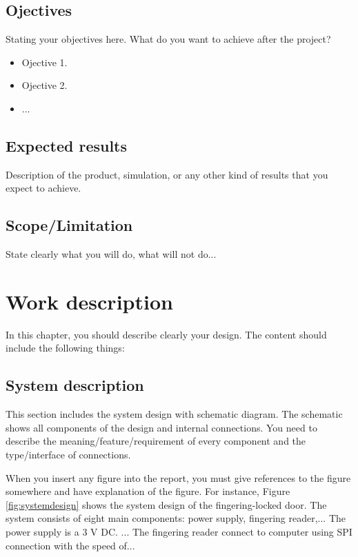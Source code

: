\documentclass[12pt]{report}
\begin{document}
\section{Ojectives}

Stating your objectives here. What do you want to achieve after the project?
\begin{itemize}
	\item Ojective 1.
	\item Ojective 2.
	\item ...
\end{itemize}

\section{Expected results}
Description of the product, simulation, or any other kind of results
that you expect to achieve.

\section{Scope/Limitation}
State clearly what you will do, what will not do...

\chapter{Work description}

In this chapter, you should describe clearly your design.
The content should include the following things:

\section{System description}
This section includes the system design with schematic diagram.
The schematic shows all components of the design and internal connections.
You need to describe the meaning/feature/requirement of every component
and the type/interface of connections.

When you insert any figure into the report,
you must give references to the figure somewhere and
have explanation of the figure.
For instance,
Figure \ref{fig:systemdesign} shows the system design of the fingering-locked door.
The system consists of eight main components: power supply, fingering reader,...
The power supply is a 3 V DC.
...
The fingering reader connect to computer using SPI connection with the speed of...
\end{document}
